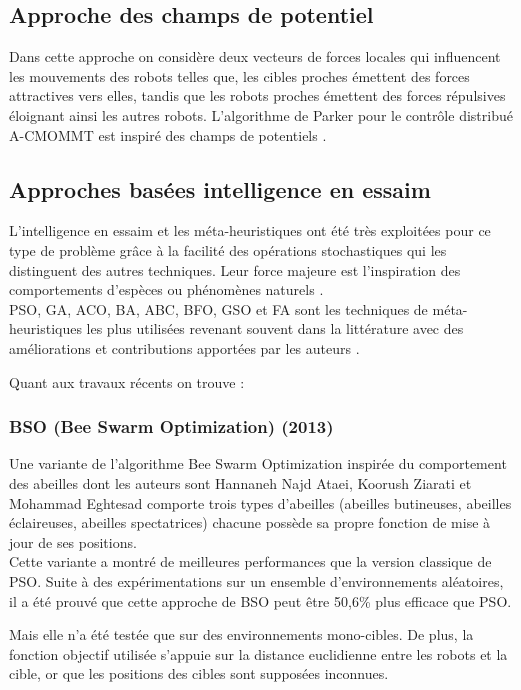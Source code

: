 \subsection{Approche des champs de potentiel \cite{surv2}}
Dans cette approche on considère deux vecteurs de forces locales qui influencent les mouvements des robots telles que, les cibles proches émettent des forces attractives vers elles, tandis que les robots proches émettent des forces répulsives éloignant ainsi les autres robots. L'algorithme de Parker pour le contrôle distribué A-CMOMMT est inspiré des champs de potentiels \cite{Parker2002}.

\subsection{Approches basées intelligence en essaim}
L'intelligence  en essaim  et les méta-heuristiques ont été très exploitées pour ce type de problème grâce à la facilité des opérations stochastiques qui les distinguent des autres techniques. Leur force majeure est l'inspiration des  comportements d'espèces ou phénomènes naturels \cite{robotMeta}.\\

PSO, GA, ACO, BA, ABC, BFO, GSO et FA sont les techniques de méta-heuristiques les plus utilisées revenant souvent dans la littérature avec des améliorations et contributions apportées par les auteurs \cite{surv1}. 

Quant aux travaux récents on trouve :

\subsubsection{BSO (Bee Swarm Optimization) (2013)}
Une variante de l’algorithme Bee Swarm Optimization inspirée du comportement des abeilles dont les auteurs sont Hannaneh Najd Ataei, Koorush Ziarati et Mohammad Eghtesad \cite{BSO2013} comporte trois types d’abeilles (abeilles butineuses, abeilles éclaireuses, abeilles spectatrices) chacune possède sa propre fonction de mise à jour de ses positions.\\	

Cette variante a montré de meilleures performances que la version classique de PSO.
Suite à des expérimentations sur un ensemble d’environnements aléatoires, il a été prouvé que cette approche de BSO peut être 50,6\% plus efficace que PSO.

Mais elle n’a été testée que sur des environnements mono-cibles. De plus, la fonction objectif utilisée s’appuie sur  la distance euclidienne entre les robots et la cible, or que les positions des cibles sont supposées inconnues.

